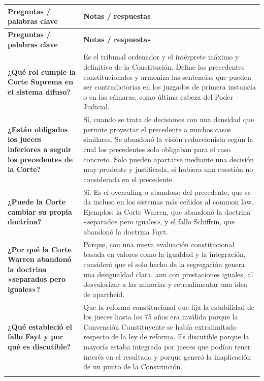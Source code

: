 \documentclass[12pt,oneside]{book}
\begin{document}
\begin{longtable}{@{}>{\RaggedRight\arraybackslash}p{}>{\RaggedRight\arraybackslash}p{}@{}}
\toprule
\textbf{Preguntas / palabras clave} & \textbf{Notas / respuestas} \\
\midrule
\endfirsthead
\toprule
\textbf{Preguntas / palabras clave} & \textbf{Notas / respuestas} \\
\midrule
\endhead
\bottomrule
\endlastfoot

\textbf{¿Qué rol cumple la Corte Suprema en el sistema difuso?} &
Es el tribunal ordenador y el intérprete máximo y definitivo de la Constitución. Define los precedentes constitucionales y armoniza las sentencias que pueden ser contradictorias en los juzgados de primera instancia o en las cámaras, como última cabeza del Poder Judicial. \\
\addlinespace[0.3em]\cmidrule[0.2pt]{1-2}\addlinespace[0.3em]

\textbf{¿Están obligados los jueces inferiores a seguir los precedentes de la Corte?} &
Sí, cuando se trata de decisiones con una densidad que permite proyectar el precedente a muchos casos similares. Se abandonó la visión reduccionista según la cual los precedentes solo obligaban para el caso concreto. Solo pueden apartarse mediante una decisión muy prudente y justificada, si hubiera una cuestión no considerada en el precedente. \\
\addlinespace[0.3em]\cmidrule[0.2pt]{1-2}\addlinespace[0.3em]

\textbf{¿Puede la Corte cambiar su propia doctrina?} &
Sí. Es el overruling o abandono del precedente, que se da incluso en los sistemas más ceñidos al common law. Ejemplos: la Corte Warren, que abandonó la doctrina «separados pero iguales», y el fallo Schiffrin, que abandonó la doctrina Fayt. \\
\addlinespace[0.3em]\cmidrule[0.2pt]{1-2}\addlinespace[0.3em]

\textbf{¿Por qué la Corte Warren abandonó la doctrina «separados pero iguales»?} &
Porque, con una nueva evaluación constitucional basada en valores como la igualdad y la integración, consideró que el solo hecho de la segregación genera una desigualdad clara, aun con prestaciones iguales, al desvalorizar a las minorías y retroalimentar una idea de apartheid. \\
\addlinespace[0.3em]\cmidrule[0.2pt]{1-2}\addlinespace[0.3em]

\textbf{¿Qué estableció el fallo Fayt y por qué es discutible?} &
Que la reforma constitucional que fija la estabilidad de los jueces hasta los 75 años era inválida porque la Convención Constituyente se había extralimitado respecto de la ley de reforma. Es discutible porque la mayoría estaba integrada por jueces que podían tener interés en el resultado y porque generó la inaplicación de un punto de la Constitución. \\
\addlinespace[0.3em]\cmidrule[0.2pt]{1-2}\addlinespace[0.3em]


\end{longtable}
\end{document}
